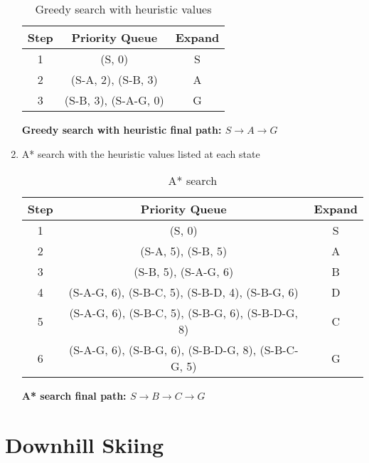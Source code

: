 \documentclass[fleqn]{hermans-hw}
\begin{document}
\begin{enumerate}
\begin{table}[H]
\centering
{\renewcommand{\arraystretch}{1.2}%
\begin{tabular}{| c | c | c |}
\hline
\textbf{Step} & \textbf{Priority Queue} & \textbf{Expand}\\
\hline
1 & (S, 0) & S\\ \hline
2 & (S-A, 2), (S-B, 3) & A\\ \hline
3 & (S-B, 3), (S-A-G, 0) & G\\ \hline
\end{tabular}}
\caption{Greedy search with heuristic values}
\end{table}

\textbf{Greedy search with heuristic final path: $S \rightarrow A \rightarrow G$}

\item A* search with the heuristic values listed at each state

\begin{table}[H]
\centering
{\renewcommand{\arraystretch}{1.2}%
\begin{tabular}{| c | c | c |}
\hline
\textbf{Step} & \textbf{Priority Queue} & \textbf{Expand}\\
\hline
1 & (S, 0) & S\\ \hline
2 & (S-A, 5), (S-B, 5) & A\\ \hline
3 & (S-B, 5), (S-A-G, 6) & B\\ \hline
4 & (S-A-G, 6), (S-B-C, 5), (S-B-D, 4), (S-B-G, 6) & D\\ \hline
5 & (S-A-G, 6), (S-B-C, 5), (S-B-G, 6), (S-B-D-G, 8) & C\\ \hline
6 & (S-A-G, 6), (S-B-G, 6), (S-B-D-G, 8), (S-B-C-G, 5) & G\\ \hline
\end{tabular}}
\caption{A* search}
\end{table}

\textbf{A* search final path: $S \rightarrow B \rightarrow C \rightarrow G$}

\end{enumerate}

\newpage
\section{Downhill Skiing}
\end{document}
